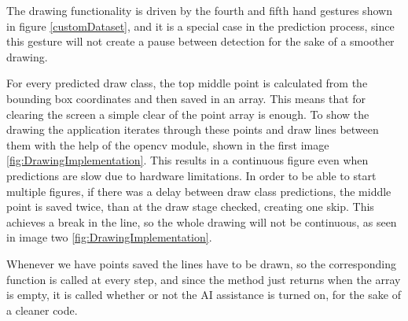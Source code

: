 \par The drawing functionality is driven by the fourth and fifth hand gestures shown in figure \ref{customDataset}, and it is a special case in the prediction process, since this gesture will not create a pause between detection for the sake of a smoother drawing.
\par For every predicted draw class, the top middle point is calculated from the bounding box coordinates and then saved in an array. This means that for clearing the screen a simple clear of the point array is enough. To show the drawing the application iterates through these points and draw lines between them with the help of the opencv module, shown in the first image \ref{fig:DrawingImplementation}. This results in a continuous figure even when predictions are slow due to hardware limitations. In order to be able to start multiple figures, if there was a delay between draw class predictions, the middle point is saved twice, than at the draw stage checked, creating one skip. This achieves a break in the line, so the whole drawing will not be continuous, as seen in image two \ref{fig:DrawingImplementation}.
\par Whenever we have points saved the lines have to be drawn, so the corresponding function is called at every step, and since the method just returns when the array is empty, it is called whether or not the AI assistance is turned on, for the sake of a cleaner code.